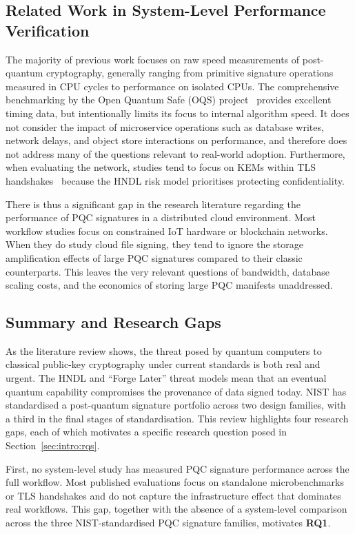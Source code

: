 \documentclass[12pt,a4paper]{article}
\begin{document}
\subsection{Related Work in System-Level Performance Verification}
\label{sec:litreview:relatedwork}

The majority of previous work focuses on raw speed measurements of post-quantum cryptography, generally ranging from primitive signature operations measured in CPU cycles to performance on isolated CPUs. The comprehensive benchmarking by the Open Quantum Safe (OQS) project~\cite{stebila2016oqs} provides excellent timing data, but intentionally limits its focus to internal algorithm speed. It does not consider the impact of microservice operations such as database writes, network delays, and object store interactions on performance, and therefore does not address many of the questions relevant to real-world adoption. Furthermore, when evaluating the network, studies tend to focus on KEMs within TLS handshakes~\cite{paquin2020benchmarking,sikeridis2020assessing} because the HNDL risk model prioritises protecting confidentiality.

There is thus a significant gap in the research literature regarding the performance of PQC signatures in a distributed cloud environment. Most workflow studies focus on constrained IoT hardware or blockchain networks. When they do study cloud file signing, they tend to ignore the storage amplification effects of large PQC signatures compared to their classic counterparts. This leaves the very relevant questions of bandwidth, database scaling costs, and the economics of storing large PQC manifests unaddressed.

\subsection{Summary and Research Gaps}

As the literature review shows, the threat posed by quantum computers to classical public-key cryptography under current standards is both real and urgent. The HNDL and ``Forge Later'' threat models mean that an eventual quantum capability compromises the provenance of data signed today. NIST has standardised a post-quantum signature portfolio across two design families, with a third in the final stages of standardisation. This review highlights four research gaps, each of which motivates a specific research question posed in Section~\ref{sec:intro:rqs}.

First, no system-level study has measured PQC signature performance across the full workflow. Most published evaluations focus on standalone microbenchmarks or TLS handshakes and do not capture the infrastructure effect that dominates real workflows. This gap, together with the absence of a system-level comparison across the three NIST-standardised PQC signature families, motivates \textbf{RQ1}.
\end{document}

